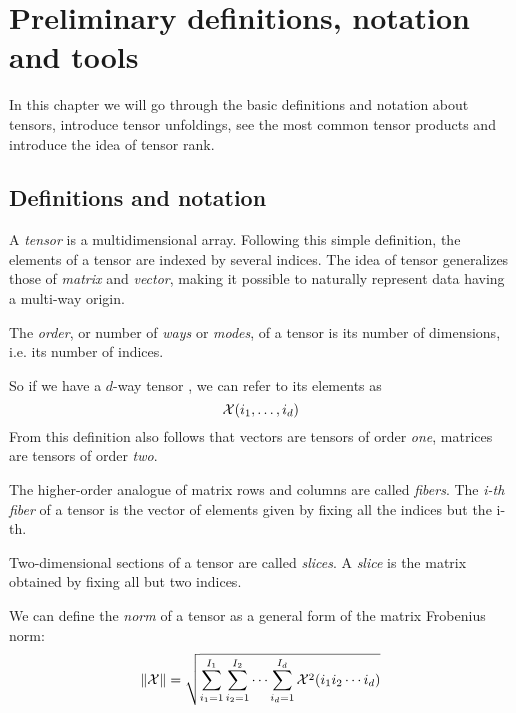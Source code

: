 \chapter{Preliminary definitions, notation and tools}

In this chapter we will go through the basic definitions and notation about tensors, introduce tensor unfoldings, see the most common tensor products and introduce the idea of tensor rank.

\section{Definitions and notation}

A \emph{tensor} is a multidimensional array. Following this simple definition, the elements of a tensor are indexed by several indices.
The idea of tensor generalizes those of \emph{matrix} and \emph{vector}, making it possible to naturally represent data having a multi-way origin.

\begin{Def}
  The \emph{order}, or number of \emph{ways} or \emph{modes}, of a tensor is its number of dimensions, i.e. its number of indices.
\end{Def}
So if we have a $d$-way tensor \X, we can refer to its elements as
\begin{equation*}
  \mathcal{X}(i_1,\ldots,i_d)
\end{equation*}
From this definition also follows that vectors are tensors of order \emph{one}, matrices are tensors of order \emph{two}.

\begin{Def}
  The higher-order analogue of matrix rows and columns are called \emph{fibers}. The \emph{i-th fiber} of a tensor \X is the vector of elements given by fixing all the indices but the i-th.
\end{Def}

\begin{Def}
  Two-dimensional sections of a tensor are called \emph{slices}. A \emph{slice} is the matrix obtained by fixing all but two indices.
\end{Def}

\begin{Def}
  We can define the \emph{norm} of a tensor as a general form of the matrix Frobenius norm:
  \[
  \|\mathcal{X}\| = \sqrt{\sum_{i_1 = 1}^{I_1}\sum_{i_2 = 1}^{I_2}\cdots\sum_{i_d = 1}^{I_d}\mathcal{X}^2(i_1 i_2 \cdots i_d)}
  \]
\end{Def}

